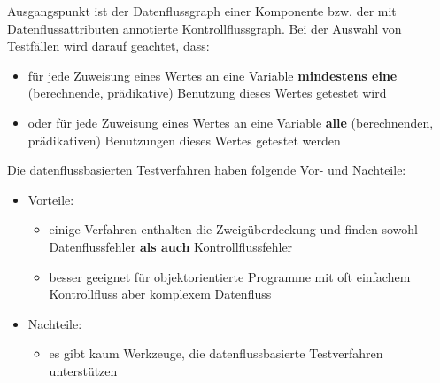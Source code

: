 Ausgangspunkt ist der Datenflussgraph einer Komponente bzw. der mit Datenflussattributen annotierte Kontrollflussgraph. Bei der Auswahl von Testfällen wird darauf geachtet, dass:
\begin{itemize}
	\item für jede Zuweisung eines Wertes an eine Variable \textbf{mindestens eine} (berechnende, prädikative) Benutzung dieses Wertes getestet wird
	\item oder für jede Zuweisung eines Wertes an eine Variable \textbf{alle} (berechnenden, prädikativen) Benutzungen dieses Wertes getestet werden
\end{itemize}
Die datenflussbasierten Testverfahren haben folgende Vor- und Nachteile:
\begin{itemize}
	\item Vorteile:
	\begin{itemize}
		\item einige Verfahren enthalten die Zweigüberdeckung und finden sowohl Datenflussfehler \textbf{als auch} Kontrollflussfehler
		\item besser geeignet für objektorientierte Programme mit oft einfachem Kontrollfluss aber komplexem Datenfluss
	\end{itemize}
	\item Nachteile:
	\begin{itemize}
		\item es gibt kaum Werkzeuge, die datenflussbasierte Testverfahren unterstützen
	\end{itemize}
\end{itemize}

